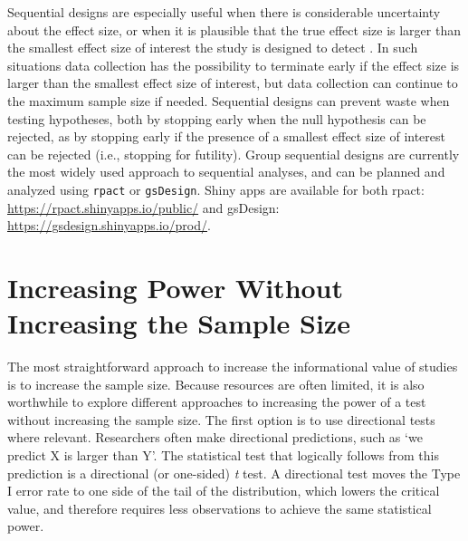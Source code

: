 \documentclass[
  oneside]{krantz}
\begin{document}
Sequential designs are especially useful when there is considerable uncertainty about the effect size, or when it is plausible that the true effect size is larger than the smallest effect size of interest the study is designed to detect \citep{lakens_performing_2014}. In such situations data collection has the possibility to terminate early if the effect size is larger than the smallest effect size of interest, but data collection can continue to the maximum sample size if needed. Sequential designs can prevent waste when testing hypotheses, both by stopping early when the null hypothesis can be rejected, as by stopping early if the presence of a smallest effect size of interest can be rejected (i.e., stopping for futility). Group sequential designs are currently the most widely used approach to sequential analyses, and can be planned and analyzed using \texttt{rpact} or \texttt{gsDesign}. Shiny apps are available for both rpact: \url{https://rpact.shinyapps.io/public/} and gsDesign: \url{https://gsdesign.shinyapps.io/prod/}.

\hypertarget{increasing-power-without-increasing-the-sample-size}{%
\section{Increasing Power Without Increasing the Sample Size}\label{increasing-power-without-increasing-the-sample-size}}

The most straightforward approach to increase the informational value of studies is to increase the sample size. Because resources are often limited, it is also worthwhile to explore different approaches to increasing the power of a test without increasing the sample size. The first option is to use directional tests where relevant. Researchers often make directional predictions, such as `we predict X is larger than Y'. The statistical test that logically follows from this prediction is a directional (or one-sided) \emph{t} test. A directional test moves the Type I error rate to one side of the tail of the distribution, which lowers the critical value, and therefore requires less observations to achieve the same statistical power.
\end{document}
